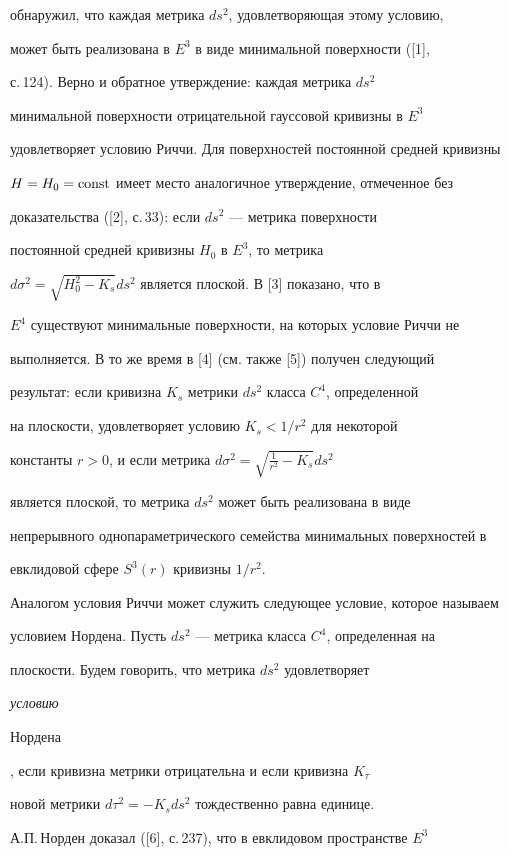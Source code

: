 обнаружил, что каждая метрика $ds^2$, удовлетворяющая этому условию, 


может быть реализована в $E^3$ в виде минимальной поверхности ([1], 


с.\,124). Верно и обратное утверждение: каждая метрика $ds^2$ 


минимальной поверхности отрицательной гауссовой кривизны в $E^3$ 


удовлетворяет условию Риччи. Для поверхностей постоянной средней кривизны 


$H=H_0=\operatorname{const}$ имеет место аналогичное утверждение, отмеченное без 


доказательства ([2], с.\,33): если $ds^2$ --- метрика поверхности 


постоянной средней кривизны $H_0$ в $E^3$, то метрика 


$d\sigma^2=\sqrt{H^2_0-K_s}ds^2$ является плоской. В [3] показано, что в 


$E^4$ существуют минимальные поверхности, на которых условие Риччи не 


выполняется. В то же время в [4] (см. также [5]) получен следующий 


результат: если кривизна $K_s$ метрики $ds^2$ класса $C^4$, определенной 


на плоскости, удовлетворяет условию $K_s<{1}/{r^2}$ для некоторой 


константы $r>0$, и если метрика $d\sigma^2=\sqrt{\frac{1}{r^2}-K_s}ds^2$ 


является плоской, то метрика $ds^2$ может быть реализована в виде 


непрерывного однопараметрического семейства минимальных поверхностей в 


евклидовой сфере $S^3(r)$ кривизны ${1}/{r^2}$. 


 


Аналогом условия Риччи может служить следующее условие, которое называем 


условием Нордена. Пусть $ds^2$ --- метрика класса $C^4$, определенная на 


плоскости. Будем говорить, что метрика $ds^2$ удовлетворяет {\it условию 


Нордена}, если кривизна метрики отрицательна и если кривизна $K_\tau$ 


новой метрики $d\tau^2=-K_s ds^2$ тождественно равна единице. 


А.П.\,Норден доказал ([6], с.\,237), что в евклидовом пространстве $E^3$ 


